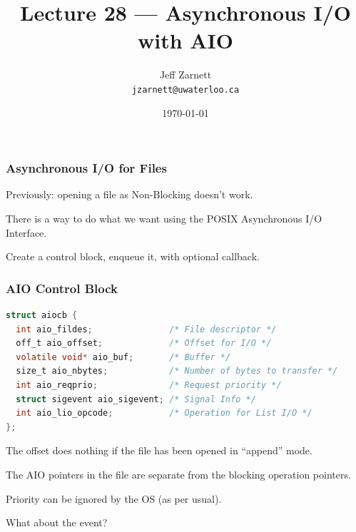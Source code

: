 

\title{Lecture 28 --- Asynchronous I/O with AIO }

\author{Jeff Zarnett \\ \small \texttt{jzarnett@uwaterloo.ca}}
\date{\today}




\begin{frame}
	\titlepage

\end{frame}



\begin{frame}
	\frametitle{Asynchronous I/O for Files}

	Previously: opening a file as Non-Blocking doesn't work.

	There is a way to do what we want using the POSIX Asynchronous I/O Interface.

	Create a control block, enqueue it, with optional callback.

\end{frame}


\begin{frame}[fragile]
	\frametitle{AIO Control Block}

	\begin{lstlisting}[language=C]
struct aiocb {
  int aio_fildes;               /* File descriptor */
  off_t aio_offset;             /* Offset for I/O */
  volatile void* aio_buf;       /* Buffer */
  size_t aio_nbytes;            /* Number of bytes to transfer */
  int aio_reqprio;              /* Request priority */
  struct sigevent aio_sigevent; /* Signal Info */
  int aio_lio_opcode;           /* Operation for List I/O */
};
\end{lstlisting}

	The offset does nothing if the file has been opened in ``append'' mode.

	The AIO pointers in the file are separate from the blocking operation pointers.

	Priority can be ignored by the OS (as per usual).

	What about the event?

\end{frame}


